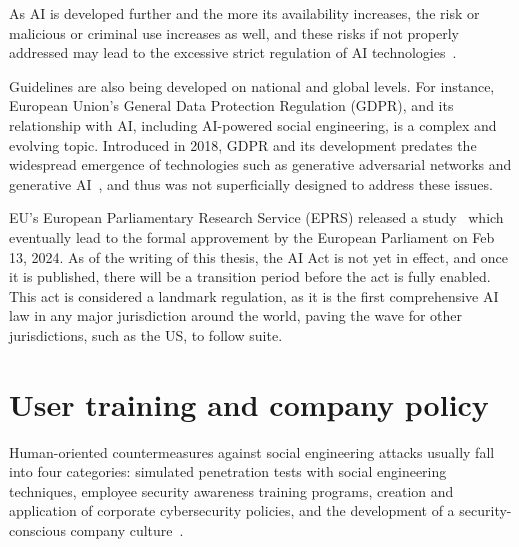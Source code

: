 As AI is developed further and the more its availability increases, the risk or malicious or criminal use increases as well, and these risks if not properly addressed may lead to the excessive strict regulation of AI technologies~\citep{king_AI_Crime_Interdisciplinary_Analysis_2019}.

Guidelines are also being developed on national and global levels. For instance, European Union's General Data Protection Regulation (GDPR), and its relationship with AI, including AI-powered social engineering, is a complex and evolving topic. Introduced in 2018, GDPR and its development predates the widespread emergence of technologies such as generative adversarial networks and generative AI~\citep{goodfellowGenerativeAdversarialNetworks2020}, and thus was not superficially designed to address these issues.

EU's European Parliamentary Research Service (EPRS) released a study~\citep{eprsTheImpactofTheGDPR2020} which eventually lead to the formal approvement by the European Parliament on Feb 13, 2024. As of the writing of this thesis, the AI Act is not yet in effect, and once it is published, there will be a transition period before the act is fully enabled. This act is considered a landmark regulation, as it is the first comprehensive AI law in any major jurisdiction around the world, paving the wave for other jurisdictions, such as the US,  to follow suite.

    


\section{User training and company policy}
\begin{comment}
    
    - VoIP has been defined before 

\end{comment}


Human-oriented countermeasures against social engineering attacks usually fall into four categories: simulated penetration tests with social engineering techniques, employee security awareness training programs, creation and application of corporate cybersecurity policies, and the development of a security-conscious company culture~\citep{tsinganos_Towards_Automated_Recognition_Chat_SE_Enterprise_2018, mitnick_The_Art_of_Deception_2003}.

